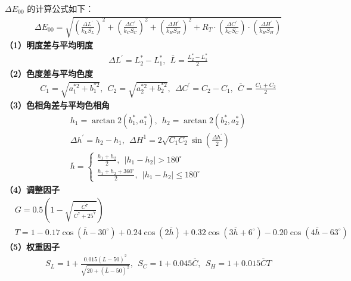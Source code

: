$\Delta E_{00}$ 的计算公式如下：
\begin{equation}
\begin{aligned}
  &\Delta E_{00}=\sqrt{(\frac{\Delta L^{'}}{k_{L}S_{L}})^{2}+(\frac{\Delta C^{'}}{k_{C}S_{C}})^{2}+(\frac{\Delta H^{'}}{k_{H}S_{H}})^{2}+R_{T}\cdot{(\frac{\Delta C^{'}}{k_{C}S_{C}})}\cdot (\frac{\Delta H^{'}}{k_{H}S_{H}})}
\end{aligned}
\end{equation}
\textbf{（1）明度差与平均明度}
\begin{equation}
\begin{aligned}
   &\Delta L^{'} = L^{*}_{2}-L^{*}_{1},\ \ \overline{L}=\frac{L^{*}_{2}-L^{*}_{1}}{2}
\end{aligned}
\end{equation}
\textbf{（2）色度差与平均色度}
\begin{equation}
\begin{aligned}
  &C_{1}=\sqrt{a^{*2}_{1}+b^{*2}_{1}},\ \ C_{2}=\sqrt{a^{*2}_{2}+b^{*2}_{2}},\ \ \Delta C^{'}=C_{2}-C_{1},\ \ \overline{C}=\frac{C_{1}+C_2}{2}
\end{aligned}
\end{equation}
\textbf{（3）色相角差与平均色相角}
\begin{equation}
\begin{aligned}
 &h_{1}=\arctan2(b^{*}_{1},a^{*}_{1}),\ \ h_{2}=\arctan2(b^{*}_{2},a^{*}_{2})\\
 &\Delta h^{'}=h_{2}-h_{1},\ \ \Delta H^{1}=2\sqrt{C_{1}C_{2}}\sin (\frac{\Delta h^{'}}{2})\\
 &\overline{h}=
 \begin{cases}
   \frac{h_{1}+h_{2}}{2},\ \ |h_{1}-h_{2}|>180^{\circ}\\
   \frac{h_{1}+h_{2}+360^{\circ}}{2},\ \ |h_{1}-h_{2}|\leq 180^{\circ}
 \end{cases}
\end{aligned}
\end{equation}
\textbf{（4）调整因子}
\begin{equation}
\begin{aligned}
  &G=0.5(1-\sqrt{\frac{\overline{C^{7}}}{\overline{C^{7}}+25^{7}}})\\
  &T=1-0.17\cos(\overline{h}-30^{\circ})+0.24\cos(2\overline{h})+0.32\cos(3\overline{h}+6^{\circ})-0.20\cos(4\overline{h}-63^{\circ})
\end{aligned}
\end{equation}
\textbf{（5）权重因子}
\begin{equation}
\begin{aligned}
 &S_{L}=1+\frac{0.015(L-50)^{2}}{\sqrt{20+(\overline{L}-50)^{2}}},\ \ S_{C}=1+0.045\overline{C},\ \ S_{H}=1+0.015\overline{C}T
\end{aligned}
\end{equation}
